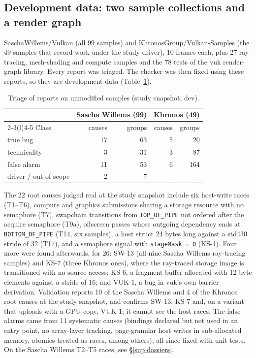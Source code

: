 \documentclass[acmtog,anonymous,review]{acmart}
\newcommand{\code}[1]{\texttt{#1}}
\begin{document}
\subsection{Development data: two sample collections and a render graph}
SaschaWillems/\-Vulkan (all 99 samples) and Khronos\-Group/\-Vulkan-\-Samples (the 49 samples
that record work under the study driver), 10 frames each, plus 27 ray-tracing, mesh-shading and compute samples and the
78 tests of the vuk render-graph library. Every report was triaged. The checker was then fixed using
these reports, so they are development data (Table~\ref{tab:s-real}).

\begin{table}[htbp]
\caption{Triage of reports on unmodified samples (study snapshot; dev).}
\label{tab:s-real}
\small
\begin{tabular}{@{}lrrrr@{}}
\toprule
& \multicolumn{2}{c}{Sascha Willems (99)} & \multicolumn{2}{c}{Khronos (49)} \\
\cmidrule(lr){2-3}\cmidrule(l){4-5}
Class & causes & groups & causes & groups \\
\midrule
true bug & 17 & 63 & 5 & 20 \\
technicality & 3 & 31 & 3 & 87 \\
false alarm & 11 & 53 & 6 & 164 \\
driver / out of scope & 2 & 7 & -- & -- \\
\bottomrule
\end{tabular}
\end{table}

The 22 root causes judged real at the study snapshot include six host-write races (T1--T6), compute and graphics
submissions sharing a storage resource with no semaphore (T7), swapchain transitions from \code{TOP\_OF\_PIPE} not ordered
after the acquire semaphore (T9a), offscreen passes whose outgoing dependency ends at \code{BOTTOM\_OF\_PIPE} (T14, six
samples), a host struct 24 bytes long against a std430 stride of 32 (T17), and a semaphore signal with
\code{stageMask = 0} (KS-1). Four more were found afterwards, for 26: SW-13 (all nine Sascha Willems ray-tracing samples)
and KS-7 (three Khronos ones), where the ray-traced storage image is transitioned with no source access; KS-6, a
fragment buffer allocated with 12-byte elements against a stride of 16; and VUK-1, a bug in vuk's own barrier
derivation. Validation reports 10 of the Sascha Willems and 4 of the Khronos root causes at the study snapshot, and
confirms SW-13, KS-7 and, on a variant that uploads with a GPU copy, VUK-1; it cannot see the host races. The false
alarms came from 11 systematic causes (bindings declared but not used in an entry point, no array-layer tracking,
page-granular host writes in sub-allocated memory, atomics treated as races, among others), all since fixed with unit
tests. On the Sascha Willems T2--T5 races, see \S\ref{sup:dossiers}.
\end{document}
